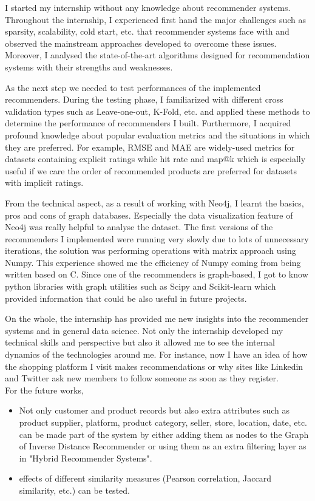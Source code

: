 I started my internship without any knowledge about recommender systems. Throughout the internship, I experienced first hand the major challenges such as sparsity, scalability, cold start, etc. that recommender systems face with and observed the mainstream approaches developed to overcome these issues. Moreover, I analysed the state-of-the-art algorithms designed for recommendation systems with their strengths and weaknesses.

As the next step we needed to test performances of the implemented recommenders. During the testing phase, I familiarized with different cross validation types such as Leave-one-out, K-Fold, etc. and applied these methods to determine the performance of recommenders I built. Furthermore, I acquired profound knowledge about popular evaluation metrics and the situations in which they are preferred. For example, RMSE and MAE are widely-used metrics for datasets containing explicit ratings while hit rate and map@k which is especially useful if we care the order of recommended products are preferred for datasets with implicit ratings. 

From the technical aspect, as a result of working with Neo4j, I learnt the basics, pros and cons of graph databases. Especially the data visualization feature of Neo4j was really helpful to analyse the dataset. The first versions of the recommenders I implemented were running very slowly due to lots of unnecessary iterations, the solution was performing operations with matrix approach using Numpy. This experience showed me the efficiency of Numpy coming from being written based on C. Since one of the recommenders is graph-based, I got to know python libraries with graph utilities such as Scipy and Scikit-learn which provided information that could be also useful in future projects.

On the whole, the internship has provided me new insights into the recommender systems and in general data science. Not only the internship developed my technical skills and perspective but also it allowed me to see the internal dynamics of the technologies around me.  For instance, now I have an idea of how the shopping platform I visit makes recommendations or why sites like Linkedin and Twitter ask new members to follow someone as soon as they register. \\

For the future works,
\begin{itemize}
	\item Not only customer and product records but also extra attributes such as product supplier, platform, product category, seller, store, location, date, etc. can be made part of the system by either adding them as nodes to the Graph of Inverse Distance Recommender or using them as an extra filtering layer as in "Hybrid Recommender Systems".
	\item effects of different similarity measures (Pearson correlation, Jaccard similarity, etc.) can be tested.
\end{itemize}